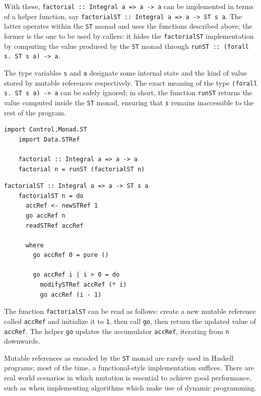 \documentclass[UdineBachThesis,american,11pt]{PhdThesis}
\begin{document}
  With these, \mbox{\texttt{factorial :: Integral a => a -> a}} can be
  implemented in terms of a helper function, say
  \mbox{\texttt{factorialST :: Integral a => a -> ST s a}}. The latter operates
  within the \mbox{\texttt{ST}} monad and uses the functions described above;
  the former is the one to be used by callers: it hides the
  \mbox{\texttt{factorialST}} implementation by computing the value produced by
  the \mbox{\texttt{ST}} monad through
  \mbox{\texttt{runST :: (forall s. ST s a) -> a}}.

  The type variables \texttt{s} and \texttt{a} designate some internal state and
  the kind of value stored by mutable references respectively. The exact meaning
  of the type \mbox{\texttt{(forall s. ST s a) -> a}} can be safely ignored; in
  short, the function \mbox{\texttt{runST}} returns the value computed inside
  the \mbox{\texttt{ST}} monad, ensuring that \texttt{s} remains inaccessible to
  the rest of the program.

  \begin{Verbatim}[gobble=4,fontsize=\small]
    import Control.Monad.ST
    import Data.STRef

    factorial :: Integral a => a -> a
    factorial n = runST (factorialST n)
  \end{Verbatim}

  \pagebreak

  \begin{Verbatim}[gobble=4,fontsize=\small]
    factorialST :: Integral a => a -> ST s a
    factorialST n = do
      accRef <- newSTRef 1
      go accRef n
      readSTRef accRef

      where
        go accRef 0 = pure ()

        go accRef i | i > 0 = do
          modifySTRef accRef (* i)
          go accRef (i - 1)
  \end{Verbatim}

  The function \mbox{\texttt{factorialST}} can be read as follows: create a new
  mutable reference called \mbox{\texttt{accRef}} and initialize it to
  \texttt{1}, then call \mbox{\texttt{go}}, then return the updated value of
  \mbox{\texttt{accRef}}. The helper \mbox{\texttt{go}} updates the accumulator
  \mbox{\texttt{accRef}}, iterating from \texttt{n} downwards.

  Mutable references as encoded by the \mbox{\texttt{ST}} monad are rarely used
  in Haskell programs; most of the time, a functional-style implementation
  suffices. There are real world scenarios in which mutation is essential to
  achieve good performance, such as when implementing algorithms which make use
  of dynamic programming.
\end{document}
